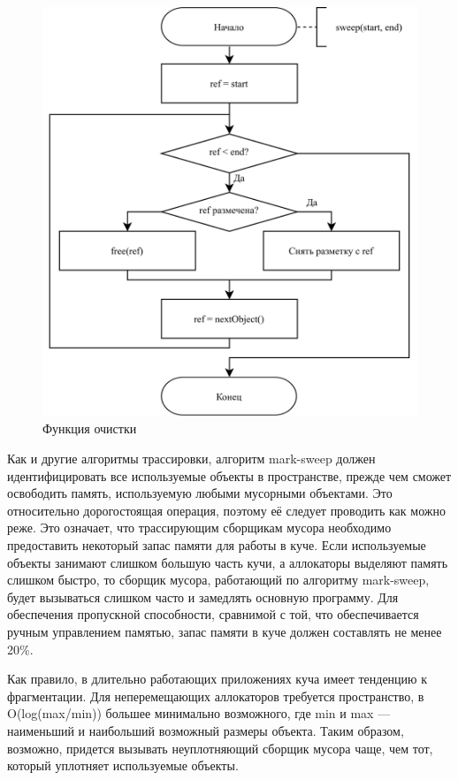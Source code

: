 \begin{figure}[H]
	\centering
	\includegraphics[scale=0.175]{assets/mark-sweep-3.png}
	\caption{Функция очистки}
	\label{fig:mark-sweep-3}
\end{figure}

Как и другие алгоритмы трассировки, алгоритм mark-sweep должен идентифицировать все используемые объекты в пространстве, прежде чем сможет освободить память, используемую любыми мусорными объектами. Это относительно дорогостоящая операция, поэтому её следует проводить как можно реже. Это означает, что трассирующим сборщикам мусора необходимо предоставить некоторый запас памяти для работы в куче. Если используемые объекты занимают слишком большую часть кучи, а аллокаторы выделяют память слишком быстро, то сборщик мусора, работающий по алгоритму mark-sweep, будет вызываться слишком часто и замедлять основную программу. Для обеспечения пропускной способности, сравнимой с той, что обеспечивается ручным управлением памятью, запас памяти в куче должен составлять не менее 20\%. \cite{handbook}

Как правило, в длительно работающих приложениях куча имеет тенденцию к фрагментации. Для неперемещающих аллокаторов требуется пространство, в O(log(max/min)) большее минимально возможного, где min и max --- наименьший и наибольший возможный размеры объекта. Таким образом, возможно, придется вызывать неуплотняющий сборщик мусора чаще, чем тот, который уплотняет используемые объекты. \cite{handbook}

